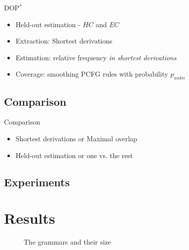 \documentclass{beamer}
\newcommand{\dops}[0]{DOP$ ^*$}
\begin{document}
\begin{frame}{\dops{}}
\begin{itemize}
\item Held-out estimation - $HC$ and $EC$
\item Extraction: Shortest derivations
\item Estimation: relative frequency \emph{in shortest derivations}
\item Coverage: smoothing PCFG rules with probability $p_{unkn}$
\end{itemize}
\end{frame}

\subsection{Comparison}
\begin{frame}{Comparison}
\begin{itemize}
\item Shortest derivations or Maximal overlap
\item Held-out estimation or one vs. the rest
\end{itemize}
\end{frame}

\subsection{Experiments}



\section{Results}
\begin{frame}
\begin{figure}[h!]
\caption{The grammars and their size}
\label{f:grammars}
\end{figure}
\end{frame}
\end{document}
